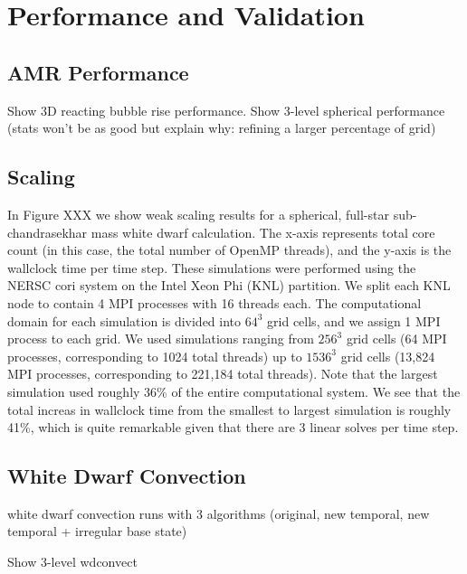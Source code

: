 \section{Performance and Validation}

\subsection{AMR Performance}
Show 3D reacting bubble rise performance.
Show 3-level spherical performance (stats won't be as good but explain why: refining a larger percentage of grid)

\subsection{Scaling}
In Figure XXX we show weak scaling results for a spherical, full-star sub-chandrasekhar mass white dwarf calculation.
The x-axis represents total core count (in this case, the total number of OpenMP threads), and the y-axis is the wallclock time per time step.
These simulations were performed using the NERSC cori system on the Intel Xeon Phi (KNL) partition.
We split each KNL node to contain 4 MPI processes with 16 threads each.
The computational domain for each simulation is divided into $64^3$ grid cells, and we assign 1 MPI process to each grid.
We used simulations ranging from $256^3$ grid cells (64 MPI processes, corresponding to 1024 total threads) up to $1536^3$ grid cells (13,824 MPI processes, corresponding to 221,184 total threads).
Note that the largest simulation used roughly 36\% of the entire computational system.
We see that the total increas in wallclock time from the smallest to largest simulation is roughly 41\%, which is quite remarkable given that there are 3 linear solves per time step.

\subsection{White Dwarf Convection}
white dwarf convection runs with 3 algorithms (original, new temporal, new temporal + irregular base state)

Show 3-level wdconvect
